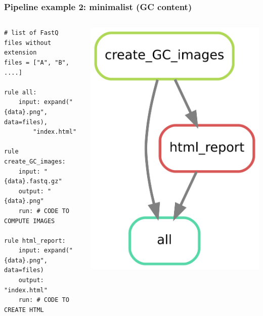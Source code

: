 \documentclass{beamer}
\begin{document}
\begin{frame}[fragile]
\frametitle{Pipeline example 2: minimalist (GC content)} 
\centering

\begin{columns}
 \begin{column}{7.2cm}
 \hspace{-2cm}
\begin{lstlisting}
# list of FastQ files without extension
files = ["A", "B", ....]

rule all:
    input: expand("{data}.png", data=files), 
        "index.html"

rule create_GC_images:
    input: "{data}.fastq.gz"
    output: "{data}.png"
    run: # CODE TO COMPUTE IMAGES
        
rule html_report:
    input: expand("{data}.png", data=files)
    output: "index.html"
    run: # CODE TO CREATE HTML 
\end{lstlisting} 
\end{column}
\begin{column}{3.9cm}
\hspace{1cm}
 \includegraphics[scale=2.2]{./images/gc.png}
\end{column}
\end{columns}
\end{frame}
\end{document}
